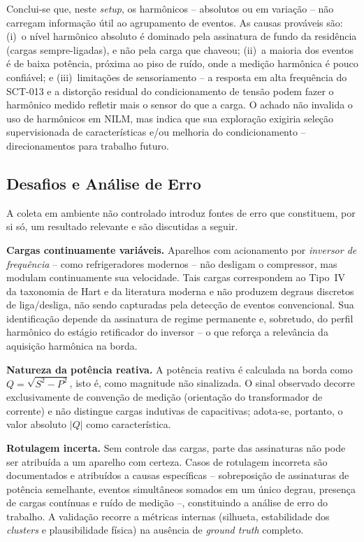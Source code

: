 \documentclass[12pt]{article}
\begin{document}
Conclui-se que, neste \textit{setup}, os harm\^onicos -- absolutos ou em
varia\c{c}\~ao -- n\~ao carregam informa\c{c}\~ao \'util ao agrupamento de eventos.
As causas prov\'aveis s\~ao: (i)~o n\'ivel harm\^onico absoluto \'e dominado pela
assinatura de fundo da resid\^encia (cargas sempre-ligadas), e n\~ao pela carga que
chaveou; (ii)~a maioria dos eventos \'e de baixa pot\^encia, pr\'oxima ao piso de
ru\'ido, onde a medi\c{c}\~ao harm\^onica \'e pouco confi\'avel; e
(iii)~limita\c{c}\~oes de sensoriamento -- a resposta em alta frequ\^encia do
SCT-013 e a distor\c{c}\~ao residual do condicionamento de tens\~ao podem fazer o
harm\^onico medido refletir mais o sensor do que a carga. O achado n\~ao invalida o
uso de harm\^onicos em NILM, mas indica que sua explora\c{c}\~ao exigiria
sele\c{c}\~ao supervisionada de caracter\'isticas e/ou melhoria do condicionamento
-- direcionamentos para trabalho futuro.

\subsection{Desafios e An\'alise de Erro}

A coleta em ambiente n\~ao controlado introduz fontes de erro que constituem, por
si s\'o, um resultado relevante e s\~ao discutidas a seguir.

\textbf{Cargas continuamente vari\'aveis.} Aparelhos com acionamento por
\textit{inversor de frequ\^encia} -- como refrigeradores modernos -- n\~ao
desligam o compressor, mas modulam continuamente sua velocidade. Tais cargas
correspondem ao Tipo~IV da taxonomia de Hart e da literatura moderna \cite{ref1,ref7} e n\~ao
produzem degraus discretos de liga/desliga, n\~ao sendo capturadas pela detec\c{c}\~ao
de eventos convencional. Sua identifica\c{c}\~ao depende da assinatura de regime
permanente e, sobretudo, do perfil harm\^onico do est\'agio retificador do
inversor -- o que refor\c{c}a a relev\^ancia da aquisi\c{c}\~ao harm\^onica na
borda.

\textbf{Natureza da pot\^encia reativa.} A pot\^encia reativa \'e calculada na
borda como $Q = \sqrt{S^2 - P^2}$, isto \'e, como magnitude n\~ao sinalizada. O
sinal observado decorre exclusivamente de conven\c{c}\~ao de medi\c{c}\~ao
(orienta\c{c}\~ao do transformador de corrente) e n\~ao distingue cargas
indutivas de capacitivas; adota-se, portanto, o valor absoluto $|Q|$ como
caracter\'istica.

\textbf{Rotulagem incerta.} Sem controle das cargas, parte das assinaturas n\~ao
pode ser atribu\'ida a um aparelho com certeza. Casos de rotulagem incorreta s\~ao
documentados e atribu\'idos a causas espec\'ificas -- sobreposi\c{c}\~ao de
assinaturas de pot\^encia semelhante, eventos simult\^aneos somados em um \'unico
degrau, presen\c{c}a de cargas cont\'inuas e ru\'ido de medi\c{c}\~ao --,
constituindo a an\'alise de erro do trabalho. A valida\c{c}\~ao recorre a
m\'etricas internas (silhueta, estabilidade dos \textit{clusters} e
plausibilidade f\'isica) na aus\^encia de \textit{ground truth} completo.
\end{document}
